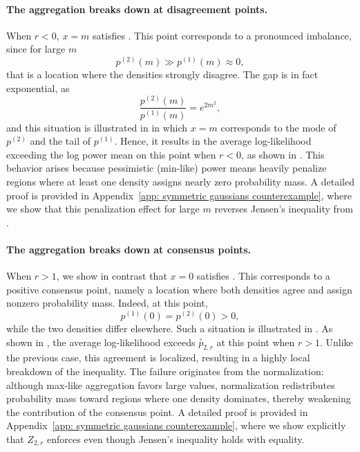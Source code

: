 \documentclass[accepted]{uai2026} %
\newcommand{\compose}[1]{\overset{\circ}{#1}}
\begin{document}
\paragraph{The aggregation breaks down at disagreement points.} When $r<0$, $x=m$ satisfies . This point corresponds to a pronounced imbalance, since for large $m$
\begin{equation}
p^{(2)}(m) \gg p^{(1)}(m) \approx 0,
\end{equation}
that is a location where the densities strongly disagree. The gap is in fact exponential, as \begin{equation}
\frac{p^{(2)}(m)}{p^{(1)}(m)}=e^{2m^2},
\end{equation} and this situation is illustrated in  in which $x=m$ corresponds to the mode of $p^{(2)}$ and the tail of $p^{(1)}$. Hence, it results in the average log-likelihood exceeding the log power mean on this point when $r<0$, as shown in . This behavior arises because pessimistic (min-like) power means heavily penalize regions where at least one density assigns nearly zero probability mass. A detailed proof is provided in Appendix~\ref{app: symmetric gaussians counterexample}, where we show that this penalization effect for large $m$ reverses Jensen's inequality from .

\paragraph{The aggregation breaks down at consensus points.} When $r>1$, we show in contrast that $x=0$ satisfies . 
This corresponds to a positive consensus point, namely a location where both densities agree and assign nonzero probability mass. Indeed, at this point,
\begin{equation}
p^{(1)}(0)=p^{(2)}(0)>0,
\end{equation}
while the two densities differ elsewhere. Such a situation is illustrated in . 
As shown in , the average log-likelihood exceeds $\compose{p}_{2,r}$ at this point when $r>1$. Unlike the previous case, this agreement is localized, resulting in a highly local breakdown of the inequality. 
The failure originates from the normalization: although max-like aggregation favors large values, normalization redistributes probability mass toward regions where one density dominates, thereby weakening the contribution of the consensus point. A detailed proof is provided in Appendix~\ref{app: symmetric gaussians counterexample}, where we show explicitly that $Z_{2,r}$ enforces  even though Jensen's inequality holds with equality.
\end{document}
